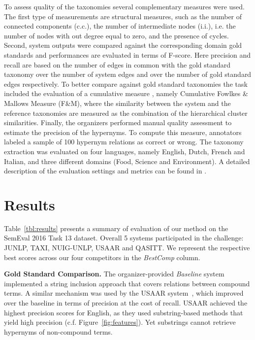 \documentclass[11pt,letterpaper]{article}
\begin{document}
To assess quality of the taxonomies several complementary  measures were used. The first type of measurements are structural measures, such as the number of connected components (c.c.), the number of intermediate nodes (i.i.), i.e. the number of nodes with out degree equal to zero, and the presence of cycles. Second, system outputs were  compared against the corresponding domain gold standards and performances are evaluated in terms of F-score. Here precision and recall are  based on the number of edges in common with the gold standard taxonomy over the number of system edges and over the number of gold standard edges respectively. To better compare against gold standard taxonomies the task included the evaluation of a cumulative measure \cite{velardi2013ontolearn}, namely Cumulative Fowlkes \& Mallows Measure (F\&M), where the similarity between the system and the reference taxonomies are measured as the combination of the hierarchical cluster similarities. Finally, the organizers performed manual quality assessment to estimate the precision of the hypernyms. To compute this measure, annotators labeled a sample of 100 hypernym relations as correct or wrong. The taxonomy extraction was evaluated on four languages, namely English, Dutch, French and Italian, and three different domains (Food, Science and Environment). A detailed description of the evaluation settings and metrics can be found in \cite{task13semeval2016}.

\section{Results}

Table~\ref{tbl:results} presents a summary of evaluation of our method on the SemEval 2016 Task 13 dataset. Overall 5 systems participated in the challenge: JUNLP, TAXI, NUIG-UNLP, USAAR and QASITT. We represent the respective best scores across our four competitors in the \textit{BestComp} column.
 
\textbf{Gold Standard Comparison.} The organizer-provided \textit{Baseline} system implemented a string inclusion approach that covers relations between compound terms. A similar mechanism was used by the USAAR system~\cite{usaarsemeval2016}, which improved over the baseline in terms of precision at the cost of recall. USAAR achieved the highest precision scores for English, as they used substring-based methods that yield high precision (c.f. Figure~\ref{fig:features}). Yet substrings cannot retrieve hypernyms of non-compound terms.
 
\end{document}
